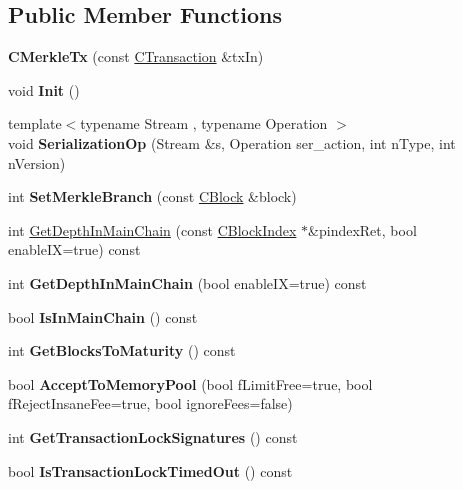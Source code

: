 \subsection*{Public Member Functions}
\begin{DoxyCompactItemize}
\item 
\mbox{\label{class_c_merkle_tx_aaf4aeddb032c6bb34559fa443bfc3476}} 
{\bfseries C\+Merkle\+Tx} (const \mbox{\hyperlink{class_c_transaction}{C\+Transaction}} \&tx\+In)
\item 
\mbox{\label{class_c_merkle_tx_ac57628e321f98642976d06b6cc231162}} 
void {\bfseries Init} ()
\item 
\mbox{\label{class_c_merkle_tx_afefd3a26c9505f1fa81587c19c22f09c}} 
{\footnotesize template$<$typename Stream , typename Operation $>$ }\\void {\bfseries Serialization\+Op} (Stream \&s, Operation ser\+\_\+action, int n\+Type, int n\+Version)
\item 
\mbox{\label{class_c_merkle_tx_a538ba1b6faedbb447cb45ac7019b6f47}} 
int {\bfseries Set\+Merkle\+Branch} (const \mbox{\hyperlink{class_c_block}{C\+Block}} \&block)
\item 
int \mbox{\hyperlink{class_c_merkle_tx_a5bf3a355593ecce5799de92d013149b1}{Get\+Depth\+In\+Main\+Chain}} (const \mbox{\hyperlink{class_c_block_index}{C\+Block\+Index}} $\ast$\&pindex\+Ret, bool enable\+IX=true) const
\item 
\mbox{\label{class_c_merkle_tx_a62f6cd33580ca300867f63ce8f49a072}} 
int {\bfseries Get\+Depth\+In\+Main\+Chain} (bool enable\+IX=true) const
\item 
\mbox{\label{class_c_merkle_tx_ad4b3623fabf1924dba2a7694e3418e1e}} 
bool {\bfseries Is\+In\+Main\+Chain} () const
\item 
\mbox{\label{class_c_merkle_tx_a69ebd437f7b44169659c3527fe73b6ab}} 
int {\bfseries Get\+Blocks\+To\+Maturity} () const
\item 
\mbox{\label{class_c_merkle_tx_a61126e811a53b941b3efdf5a4e83db90}} 
bool {\bfseries Accept\+To\+Memory\+Pool} (bool f\+Limit\+Free=true, bool f\+Reject\+Insane\+Fee=true, bool ignore\+Fees=false)
\item 
\mbox{\label{class_c_merkle_tx_a29ab20d0785095dba254ca1050ba6989}} 
int {\bfseries Get\+Transaction\+Lock\+Signatures} () const
\item 
\mbox{\label{class_c_merkle_tx_a72a7897d620c425280a4af4db87e3601}} 
bool {\bfseries Is\+Transaction\+Lock\+Timed\+Out} () const
\end{DoxyCompactItemize}
